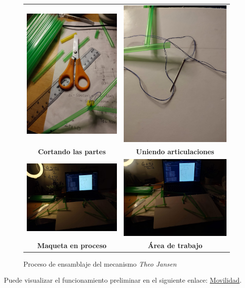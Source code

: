 \begin{figure}[H]
  \centering
  \begin{tabular}{cc}
    \includegraphics[width=0.2\linewidth]{./assets/mak1.jpeg} & 
    \includegraphics[width=0.2\linewidth]{./assets/mak2.jpeg} \\
    \textbf{Cortando las partes} & \textbf{Uniendo articulaciones} \\
    \includegraphics[width=0.2\linewidth]{./assets/mak3.jpeg} & 
    \includegraphics[width=0.2\linewidth]{./assets/mak4.jpeg} \\
    \textbf{Maqueta en proceso} & \textbf{Área de trabajo} \\
  \end{tabular}
  \caption{Proceso de ensamblaje del mecanismo \textit{Theo Jansen}}
  \label{fig:proceso}
\end{figure}

Puede visualizar el funcionamiento preliminar en el siguiente enlace: \href{https://youtu.be/ags0tXvnRCw}{Movilidad}.
